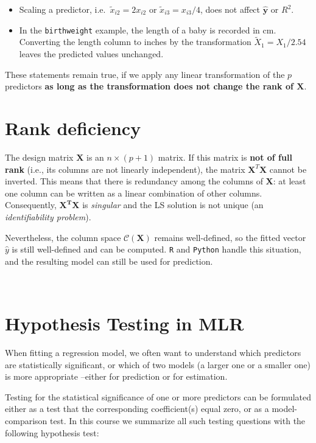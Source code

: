 \documentclass[
]{book}
\begin{document}
\begin{itemize}
\item
  Scaling a predictor, i.e.~\(\tilde{x}_{i2} =  2 x_{i2}\) or \(\tilde{x}_{i3} =  x_{i3}/4\), does not affect \(\hat{\mathbf{y}}\) or \(R^2\).
\item
  In the \texttt{birthweight} example, the length of a baby is recorded in cm. Converting the length column to inches by the transformation \(\tilde{X}_1 = X_1/2.54\) leaves the predicted values unchanged.
\end{itemize}

These statements remain true, if we apply any linear transformation of the \(p\) predictors \textbf{as long as the transformation does not change the rank of \(\mathbf{X}\)}.

\section{Rank deficiency}\label{rank-deficiency}

The design matrix \(\mathbf{X}\) is an \(n\times (p+1)\) matrix. If this matrix is \textbf{not of full rank} (i.e., its columns are not linearly independent), the matrix \(\mathbf{X}^T \mathbf{X}\) cannot be inverted. This means that there is redundancy among the columns of \(\mathbf{X}\): at least one column can be written as a linear combination of other columns. Consequently, \(\mathbf{X^T X}\) is \emph{singular} and the LS solution is not unique (an \emph{identifiability problem}).

Nevertheless, the column space \(\mathcal{C}(\mathbf{X})\) remains well-defined, so the fitted vector \(\hat{y}\) is still well-defined and can be computed. \texttt{R} and \texttt{Python} handle this situation, and the resulting model can still be used for prediction.

~

\section{Hypothesis Testing in MLR}\label{hypothesis-testing-in-mlr}

When fitting a regression model, we often want to understand which predictors are statistically significant, or which of two models (a larger one or a smaller one) is more appropriate --either for prediction or for estimation.

Testing for the statistical significance of one or more predictors can be formulated either as a test that the corresponding coefficient(s) equal zero, or as a model-comparison test. In this course we summarize all such testing questions with the following hypothesis test:
\end{document}
